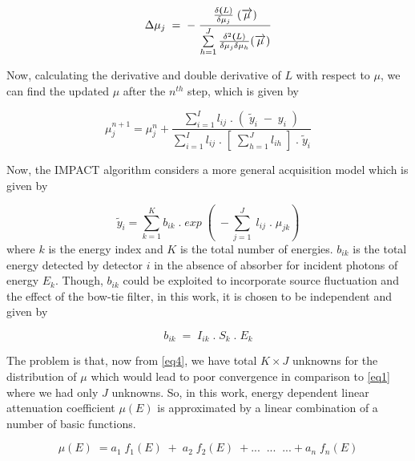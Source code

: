 \begin{equation}
\label{eq2}
\Delta\mu_j \; = \; - \; \frac{\frac{\delta \textbf(L)}{\delta\mu_j} \; (\overrightarrow{\mu})}{\sum\limits_{h=1}^J \frac{\delta^{2}\textbf(L)}{\delta\mu_{j}\delta\mu_h}(\overrightarrow{\mu})}
\end{equation}

Now, calculating the derivative and double derivative of $L$ with respect to $\mu$, we can find the updated $\mu$ after the $n^{th}$ step, which is given by

\begin{equation}
\label{eq3}
\mu_{j}^{n+1} = \mu_{j}^{n} + \frac{\sum\limits_{i=1}^I l_{ij} \; . \; \left( \; \widetilde{y}_{i} \; - \; {y}_{i} \; \right)}{\sum\limits_{i=1}^I l_{ij} \; . \; \left[ \; \sum\limits_{h=1}^J l_{ih} \; \right] \; . \; \widetilde{y}_{i}}
\end{equation}

Now, the IMPACT algorithm considers a more general acquisition model which is given by 

\begin{equation}
\label{eq4}
\widetilde{y}_{i} = \sum\limits_{k=1}^K  b_{ik} \; . \; exp \; \left( \; -\sum\limits_{j=1}^J \; l_{ij} \; . \; \mu_{jk} \right)
\end{equation} where $k$ is the energy index and $K$ is the total number of energies. $b_{ik}$ is the total energy detected by detector $i$ in the absence of absorber for incident photons of energy $E_{k}$. Though, $b_{ik}$ could be exploited to incorporate source fluctuation and the effect of the bow-tie filter, in this work, it is chosen to be independent and given by

\begin{equation}
\label{eq5}
b_{ik}\; = \; I_{ik}\; . \; S_{k} \; . \; E_{k}
\end{equation}

The problem is that, now from \ref{eq4}, we have total $K \times J$ unknowns for the distribution of $\mu$ which would lead to poor convergence in comparison to \ref{eq1} where we had only $J$ unknowns. So, in this work, energy dependent linear attenuation coefficient $\mu (E)$ is approximated by a linear combination of a number of basic functions.

\begin{equation}
\label{eq6}
\mu(E) \; = a_{1} \; f_{1}(E) \; + \; a_{2} \; f_{2}(E) \; + ... \; \; ... \; \; ... + a_{n} \; f_{n}(E)
\end{equation}

